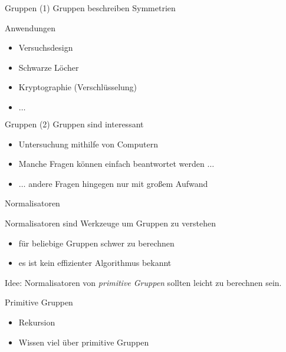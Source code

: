 \begin{frame}{Gruppen (1)}
Gruppen beschreiben Symmetrien

Anwendungen
\begin{itemize}
\item Versuchsdesign
\item Schwarze Löcher
\item Kryptographie (Verschlüsselung)
\item $\ldots$
\end{itemize}
\end{frame}

\begin{frame}{Gruppen (2)}
Gruppen sind interessant
\begin{itemize}
\item Untersuchung mithilfe von Computern
\item Manche Fragen können einfach beantwortet werden $\ldots$
\item $\ldots$ andere Fragen hingegen nur mit großem Aufwand
\end{itemize}
\end{frame}

\begin{frame}{Normalisatoren}

Normalisatoren sind Werkzeuge um Gruppen zu verstehen

\begin{itemize}
\item für beliebige Gruppen schwer zu berechnen
\item es ist kein effizienter Algorithmus bekannt
\end{itemize}

Idee: Normalisatoren von \emph{primitive Gruppen} sollten leicht zu berechnen
sein.
\end{frame}

\begin{frame}{Primitive Gruppen}
\begin{itemize}
\item Rekursion
\item Wissen viel über primitive Gruppen
\end{itemize}
\end{frame}
